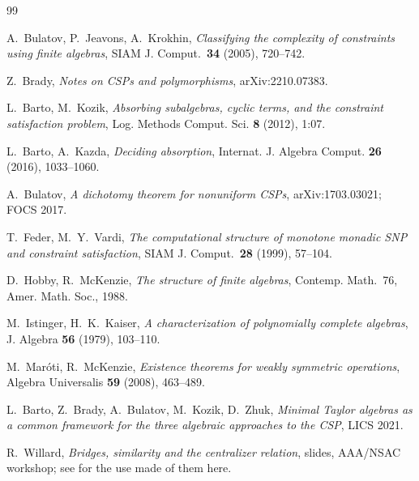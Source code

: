 \documentclass[11pt]{article}
\begin{document}
\clearpage

\clearpage


\clearpage

\clearpage

\clearpage



\clearpage

\clearpage

\clearpage

\clearpage

\clearpage


\clearpage
\begin{thebibliography}{99}

 A.~Bulatov, P.~Jeavons, A.~Krokhin,
  \emph{Classifying the complexity of constraints using finite algebras},
  SIAM J. Comput.\ \textbf{34} (2005), 720--742.

 Z.~Brady, \emph{Notes on CSPs and polymorphisms},
  arXiv:2210.07383.

 L.~Barto, M.~Kozik, \emph{Absorbing subalgebras, cyclic
  terms, and the constraint satisfaction problem}, Log. Methods Comput. Sci.
  \textbf{8} (2012), 1:07.

 L.~Barto, A.~Kazda, \emph{Deciding absorption},
  Internat. J. Algebra Comput. \textbf{26} (2016), 1033--1060.

 A.~Bulatov, \emph{A dichotomy theorem for nonuniform CSPs},
  arXiv:1703.03021; FOCS 2017.

 T.~Feder, M.~Y.~Vardi, \emph{The computational structure of
  monotone monadic SNP and constraint satisfaction}, SIAM J. Comput.\
  \textbf{28} (1999), 57--104.

 D.~Hobby, R.~McKenzie, \emph{The structure of finite
  algebras}, Contemp. Math.~76, Amer. Math. Soc., 1988.

 M.~Istinger, H.~K.~Kaiser, \emph{A characterization of
  polynomially complete algebras}, J. Algebra \textbf{56} (1979), 103--110.

 M.~Mar\'oti, R.~McKenzie, \emph{Existence theorems for
  weakly symmetric operations}, Algebra Universalis \textbf{59} (2008),
  463--489.

 L.~Barto, Z.~Brady, A.~Bulatov, M.~Kozik, D.~Zhuk,
  \emph{Minimal Taylor algebras as a common framework for the three algebraic
  approaches to the CSP}, LICS 2021.

 R.~Willard, \emph{Bridges, similarity and the centralizer
  relation}, slides, AAA/NSAC workshop; see \cite{ZhukSimplified} for the use made
  of them here.


\end{thebibliography}
\end{document}
